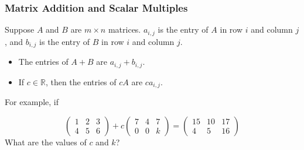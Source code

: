 \begin{frame}
\frametitle{Matrix Addition and Scalar Multiples}

Suppose $ A$ and $B $ are $ m \times n$ matrices. \pause $a _{i,j}$ is the entry of $A$ in row $i$ and column $j$, and \pause $b _{i,j}$ is the entry of $B$ in row $i$ and column $j$. 

\begin{itemize}

    \item The entries of $ A+B$ are $a_{i,j} + b_{i,j}$. 

    \item If $ c \in \mathbb R$, then the entries of $c A$ are $c a _{i,j}$.  

\end{itemize}
\pause 
For example, if 

$$
\begin{pmatrix} 1 & 2 & 3 \\ 4 & 5 & 6 \end{pmatrix} + c
\begin{pmatrix} 7 & 4 & 7 \\ 0 & 0 & k \end{pmatrix} =
\begin{pmatrix} 15 & 10 & 17 \\ 4 & 5 & 16 \end{pmatrix}
$$
What are the values of $c$ and $k$?

\end{frame}











